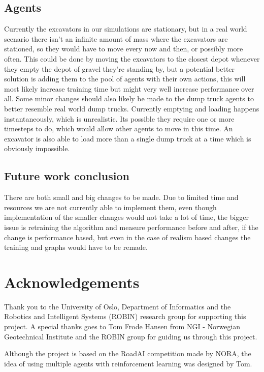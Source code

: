 \documentclass[conference]{IEEEtran}
\begin{document}
	\subsection{Agents}
	Currently the excavators in our simulations are stationary, but in a real world scenario there isn't an infinite amount of mass where the excavators are stationed, so they would have to move every now and then, or possibly more often.
	This could be done by moving the excavators to the closest depot whenever they empty the depot of gravel they're standing by, but a potential better solution is adding them to the pool of agents with their own actions, this will most likely increase training time but might very well increase performance over all.
	Some minor changes should also likely be made to the dump truck agents to better resemble real world dump trucks.
	Currently emptying and loading happens instantaneously, which is unrealistic. Its possible they require one or more timesteps to do, which would allow other agents to move in this time.
	An excavator is also able to load more than a single dump truck at a time which is obviously impossible.

	\subsection{Future work conclusion}
	There are both small and big changes to be made. Due to limited time and resources we are not currently able to implement them, even though implementation of the smaller changes would not take a lot of time, the bigger issue is retraining the algorithm and measure performance before and after, if the change is performance based, but even in the case of realism based changes the training and graphs would have to be remade.


	\section{Acknowledgements}
	Thank you to the University of Oslo, Department of Informatics and the Robotics and
	Intelligent Systems (ROBIN) research group for supporting this project. A special thanks goes to
	Tom Frode Hansen from NGI - Norwegian Geotechnical Institute and the ROBIN group for guiding us through
	this project.

	Although the project is based on the RoadAI competition made by NORA, the idea of using multiple
	agents with reinforcement learning was designed by Tom.
\end{document}
